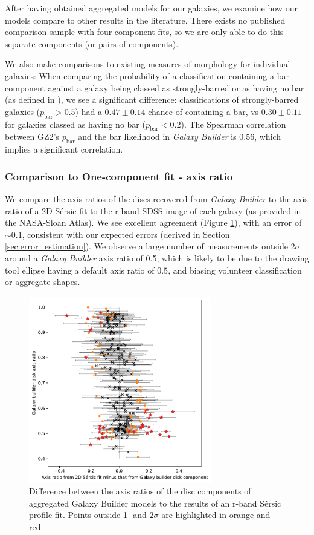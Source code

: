 \documentclass[../main.tex]{subfiles}
\begin{document}
After having obtained aggregated models for our galaxies, we examine how our models compare to other results in the literature. There exists no published comparison sample with four-component fits, so we are only able to do this separate components (or pairs of components).

We also make comparisons to existing measures of morphology for individual galaxies: When comparing the probability of a classification containing a bar component against a galaxy being classed as strongly-barred or as having no bar (as defined in \citealt{Masters2010:1003.0449v2}), we see a significant difference: classifications of strongly-barred galaxies ($p_\text{bar} > 0.5$) had a $0.47 \pm 0.14$ chance of containing a bar, vs $0.30 \pm 0.11$ for galaxies classed as having no bar ($p_\text{bar} < 0.2$). The Spearman correlation between GZ2's $p_\text{bar}$ and the bar likelihood in \textit{Galaxy Builder} is $0.56$, which implies a significant correlation.

\subsubsection{Comparison to One-component fit - axis ratio}
We compare the axis ratios of the discs recovered from \textit{Galaxy Builder} to the axis ratio of a 2D S\'ersic fit to the r-band SDSS image of each galaxy (as provided in the NASA-Sloan Atlas). We see excellent agreement (Figure \ref{fig:ax_ratio_comparison}), with an error of $\sim0.1$, consistent with our expected errors (derived in Section \ref{sec:error_estimation}). We observe a large number of measurements outside $2\sigma$ around a \textit{Galaxy Builder} axis ratio of 0.5, which is likely to be due to the drawing tool ellipse having a default axis ratio of $0.5$, and biasing volunteer classification or aggregate shapes.

\begin{figure}
  \includegraphics[width=8cm]{images__results/gzb-agg-nsa-comparison.pdf}
  \caption{Difference between the axis ratios of the disc components of aggregated Galaxy Builder models to the results of an r-band S\'ersic profile fit. Points outside 1- and $2\sigma$ are highlighted in orange and red.}
  \label{fig:ax_ratio_comparison}
\end{figure}
\end{document}
